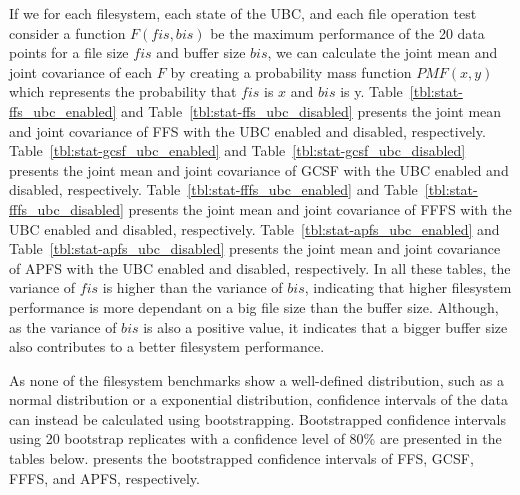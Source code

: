 If we for each filesystem, each state of the \gls{UBC}, and each file operation test consider a function $F(fis, bis)$ be the maximum performance of the 20 data points for a file size $fis$ and buffer size $bis$, we can calculate the joint mean and joint covariance of each $F$ by creating a probability mass function $PMF(x, y)$ which represents the probability that $fis$ is $x$ and $bis$ is y. Table~\ref{tbl:stat-ffs_ubc_enabled} and Table~\ref{tbl:stat-ffs_ubc_disabled} presents the joint mean and joint covariance of \gls{FFS} with the \gls{UBC} enabled and disabled, respectively. Table~\ref{tbl:stat-gcsf_ubc_enabled} and Table~\ref{tbl:stat-gcsf_ubc_disabled} presents the joint mean and joint covariance of \gls{GCSF} with the \gls{UBC} enabled and disabled, respectively. Table~\ref{tbl:stat-fffs_ubc_enabled} and Table~\ref{tbl:stat-fffs_ubc_disabled} presents the joint mean and joint covariance of \gls{FFFS} with the \gls{UBC} enabled and disabled, respectively. Table~\ref{tbl:stat-apfs_ubc_enabled} and Table~\ref{tbl:stat-apfs_ubc_disabled} presents the joint mean and joint covariance of \gls{APFS} with the \gls{UBC} enabled and disabled, respectively. In all these tables, the variance of $fis$ is higher than the variance of $bis$, indicating that higher filesystem performance is more dependant on a big file size than the buffer size. Although, as the variance of $bis$ is also a positive value, it indicates that a bigger buffer size also contributes to a better filesystem performance.


\FloatBarrier

\FloatBarrier



\FloatBarrier

\FloatBarrier



\FloatBarrier

\FloatBarrier



\FloatBarrier

\FloatBarrier

As none of the filesystem benchmarks show a well-defined distribution, such as a normal distribution or a exponential distribution, confidence intervals of the data can instead be calculated using bootstrapping. Bootstrapped confidence intervals using 20 bootstrap replicates with a confidence level of 80\% are presented in the tables below.  presents the bootstrapped confidence intervals of \gls{FFS}, \gls{GCSF}, \gls{FFFS}, and \gls{APFS}, respectively.

